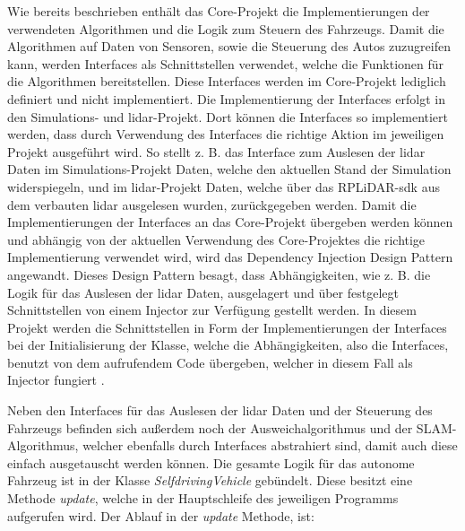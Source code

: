 Wie bereits beschrieben enthält das Core-Projekt die Implementierungen der verwendeten Algorithmen und die Logik zum Steuern des Fahrzeugs. 
Damit die Algorithmen auf Daten von Sensoren, sowie die Steuerung des Autos zuzugreifen kann, werden Interfaces als Schnittstellen verwendet, 
welche die Funktionen für die Algorithmen bereitstellen. Diese Interfaces werden im Core-Projekt lediglich definiert und nicht implementiert. 
Die Implementierung der Interfaces erfolgt in den Simulations- und \ac{lidar}-Projekt. 
Dort können die Interfaces so implementiert werden, dass durch Verwendung des Interfaces die richtige Aktion im jeweiligen Projekt ausgeführt wird. 
So stellt z. B. das Interface zum Auslesen der \ac{lidar} Daten im Simulations-Projekt Daten, welche den aktuellen Stand der Simulation widerspiegeln, 
und im \ac{lidar}-Projekt Daten, welche über das RPLiDAR-\ac{sdk} aus dem verbauten \ac{lidar} ausgelesen wurden, zurückgegeben werden.
 Damit die Implementierungen der Interfaces an das Core-Projekt übergeben werden können und abhängig von der aktuellen Verwendung des Core-Projektes 
 die richtige Implementierung verwendet wird, wird das Dependency Injection Design Pattern angewandt. 
 Dieses Design Pattern besagt, dass Abhängigkeiten, wie z. B. die Logik für das Auslesen der \ac{lidar} Daten, 
 ausgelagert und über festgelegt Schnittstellen von einem Injector zur Verfügung gestellt werden. 
 In diesem Projekt werden die Schnittstellen in Form der Implementierungen der Interfaces bei der Initialisierung der Klasse, 
 welche die Abhängigkeiten, also die Interfaces, benutzt von dem aufrufendem Code übergeben, 
 welcher in diesem Fall als Injector fungiert \cite{dependencyInjection}. 

Neben den Interfaces für das Auslesen der \ac{lidar} Daten und der Steuerung des Fahrzeugs befinden sich außerdem noch der Ausweichalgorithmus 
und der SLAM-Algorithmus, welcher ebenfalls durch Interfaces abstrahiert sind, damit auch diese einfach ausgetauscht werden können. 
Die gesamte Logik für das autonome Fahrzeug ist in der Klasse \textit{SelfdrivingVehicle} gebündelt. 
Diese besitzt eine Methode \textit{update}, welche in der Hauptschleife des jeweiligen Programms aufgerufen wird. 
Der Ablauf in der \textit{update} Methode, ist:

